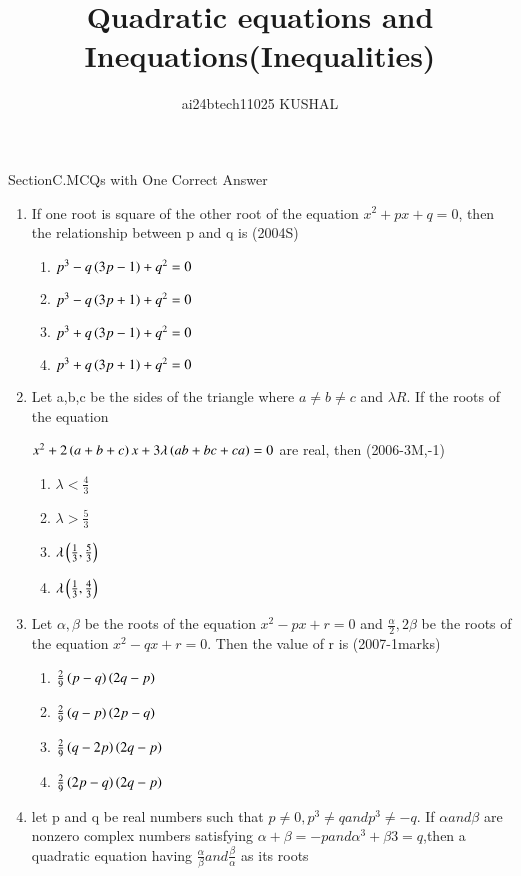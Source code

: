 \documentclass[journal,12pt,twocolumn]{IEEEtran}
\theoremstyle{remark}
\begin{document}

\vspace{3cm}
\newpage
\bigskip
\renewcommand{\thefigure}{\theenumi}
\renewcommand{\thetable}{\theenumi}

\title{Quadratic equations and Inequations(Inequalities) }
\author{ai24btech11025 KUSHAL%
}
\maketitle\Large{SectionC.MCQs with One Correct Answer}
\begin{enumerate}[start=31]
\item If one root is square of the other root of the equation $x^{2}+px+q=0$, then the relationship between p and q is \hfill (2004S)

\begin{enumerate}
    \item $p^{3}-q\left(3p-1\right)+q^{2}=0$
    \item $p^{3}-q\left(3p+1\right)+q^{2}=0$
    \item $p^{3}+q\left(3p-1\right)+q^{2}=0$
    \item $p^{3}+q\left(3p+1\right)+q^{2}=0$
\end{enumerate}
\item Let a,b,c be the sides of the triangle where $a\neq b\neq c$ and $\lambda  R$. If the roots of the equation 

$x^{2}+2\left(a+b+c\right)x+3\lambda\left(ab+bc+ca\right)=0$ are real, then \hfill(2006-3M,-1)
\begin{multicols}{2}
    \begin{enumerate}
        \item $\lambda<\frac{4}{3}$
        \item $\lambda>\frac{5}{3}$
        \item $\lambda \left(\frac{1}{3},\frac{5}{3}\right)$
        \item $\lambda \left(\frac{1}{3},\frac{4}{3}\right)$
    \end{enumerate}
\end{multicols}
\item Let $\alpha,\beta$ be the roots of the equation $x^{2}-px+r=0$ and $\frac{\alpha}{2},2\beta$ be the roots of the equation $x^{2}-qx+r=0$. Then the value of r is \hfill (2007-1marks)

\begin{enumerate}
    \item $\frac{2}{9}\left(p-q\right)\left(2q-p\right)$
    \item $\frac{2}{9}\left(q-p\right)\left(2p-q\right)$
    \item $\frac{2}{9}\left(q-2p\right)\left(2q-p\right)$
    \item $\frac{2}{9}\left(2p-q\right)\left(2q-p\right)$
\end{enumerate}
\item let p and q be real numbers such that $p\neq 0,p^{3}\neq q and p^{3}\neq -q.$ If $\alpha and \beta$ are nonzero complex numbers satisfying $\alpha+\beta=-p and \alpha^{3}+\beta{3}=q$,then a quadratic equation having $\frac{\alpha}{\beta} and \frac{\beta}{\alpha}$ as its roots 


\end{enumerate}
\end{document}
